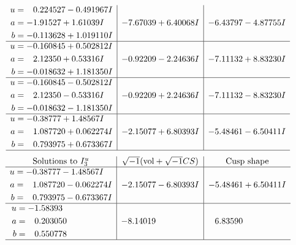 \documentclass[1p]{elsarticle_modified}
\theoremstyle{definition}
\newcommand{\I}{\sqrt{-1}}
\begin{document}
$$\begin{array}{c|c|c}
\begin{aligned}
u &= \phantom{-}0.224527 - 0.491967 I \\
a &= -1.91527 + 1.61039 I \\
b &= -0.113628 + 1.019110 I\end{aligned}
 & -7.67039 + 6.40068 I & -6.43797 - 4.87755 I \\ \hline\begin{aligned}
u &= -0.160845 + 0.502812 I \\
a &= \phantom{-}2.12350 + 0.53316 I \\
b &= -0.018632 + 1.181350 I\end{aligned}
 & -0.92209 - 2.24636 I & -7.11132 + 8.83230 I \\ \hline\begin{aligned}
u &= -0.160845 - 0.502812 I \\
a &= \phantom{-}2.12350 - 0.53316 I \\
b &= -0.018632 - 1.181350 I\end{aligned}
 & -0.92209 + 2.24636 I & -7.11132 - 8.83230 I \\ \hline\begin{aligned}
u &= -0.38777 + 1.48567 I \\
a &= \phantom{-}1.087720 + 0.062274 I \\
b &= \phantom{-}0.793975 + 0.673367 I\end{aligned}
 & -2.15077 + 6.80393 I & -5.48461 - 6.50411 I\\
 \hline 
 \end{array}$$\newpage$$\begin{array}{c|c|c}  
\text{Solutions to }I^u_{3}& \I (\text{vol} + \sqrt{-1}CS) & \text{Cusp shape}\\
 \hline 
\begin{aligned}
u &= -0.38777 - 1.48567 I \\
a &= \phantom{-}1.087720 - 0.062274 I \\
b &= \phantom{-}0.793975 - 0.673367 I\end{aligned}
 & -2.15077 - 6.80393 I & -5.48461 + 6.50411 I \\ \hline\begin{aligned}
u &= -1.58393\phantom{ +0.000000I} \\
a &= \phantom{-}0.203050\phantom{ +0.000000I} \\
b &= \phantom{-}0.550778\phantom{ +0.000000I}\end{aligned}
 & -8.14019\phantom{ +0.000000I} & \phantom{-}6.83590\phantom{ +0.000000I}\\
 \hline 
 \end{array}$$\newpage\newpage\renewcommand{\arraystretch}{1}
\end{document}
